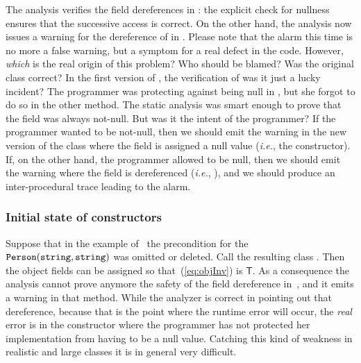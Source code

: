 \documentclass{llncs}
\newcommand{\refEq}[1]{(\ref{eq:#1})}
\begin{document}
The analysis verifies the field dereferences in : the explicit check for  nullness ensures that the successive access is correct.
On the other hand, the analysis now issues a warning for the dereference of  in .
Please note that the alarm this time is no more a false warning, but a symptom for a real defect in the code.
However, \emph{which} is the real origin of this problem?
Who should be blamed? 
Was the original class correct?
In the first version of , the verification of  was it just a lucky incident? 
The programmer was protecting against  being null in , but she forgot to do so in the other method.
The static analysis was smart enough to prove that the field  was always not-null.
But was it the intent of the programmer?
If the programmer wanted  to be not-null, then we should emit the warning in the new version of the class  where the field is assigned  a null value (\emph{i.e.}, the constructor).
If, on the other hand, the programmer allowed  to be null, then we should emit the warning where the field is dereferenced (\emph{i.e.}, ), and we should produce an inter-procedural trace leading to the alarm.

\subsubsection{Initial state of constructors}
Suppose that in the example of~ the precondition for the $\mathtt{Person(string, string)}$ was omitted or deleted.
Call the resulting class .
Then the object fields can be assigned  so that~\refEq{objInv} is $\mathsf{T}$.
As a consequence the analysis cannot prove anymore the safety of the field dereference in~, and it emits a warning in that method.
While the analyzer is correct in pointing out that dereference, because that is the point where the runtime error will occur, the \emph{real} error is in the constructor where the programmer has not protected her implementation from having  to be a null value.
Catching this kind of weakness in realistic and large classes it is in general very difficult.
\end{document}
